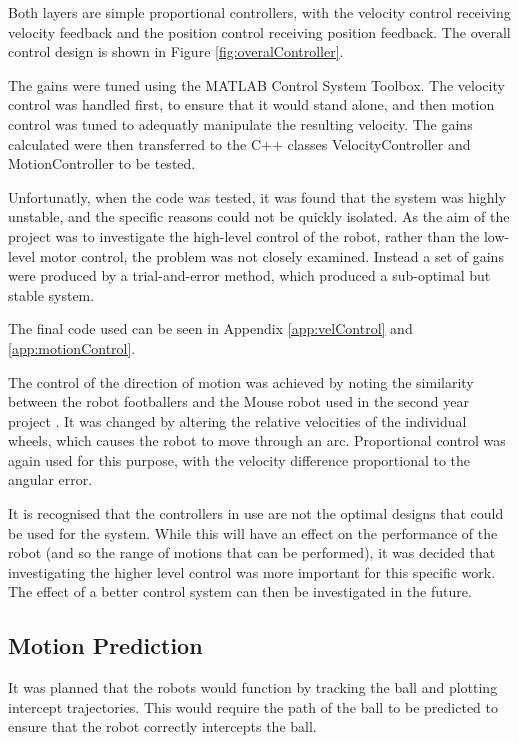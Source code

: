 \documentclass[10pt]{article}
\begin{document}
Both layers are simple proportional controllers, with the velocity control
receiving velocity feedback and the position control receiving position
feedback.  The overall control design is shown in Figure
\ref{fig:overalController}.

The gains were tuned using the MATLAB Control System Toolbox. The velocity
control was handled first, to ensure that it would stand alone, and then motion
control was tuned to adequatly manipulate the resulting velocity.  The gains
calculated were then transferred to the C++ classes VelocityController and
MotionController to be tested.

Unfortunatly, when the code was tested, it was found that the system was highly
unstable, and the specific reasons could not be quickly isolated.  As the aim of
the project was to investigate the high-level control of the robot, rather than
the low-level motor control, the problem was not closely examined.  Instead a
set of gains were produced by a trial-and-error method, which produced a
sub-optimal but stable system.

The final code used can be seen in Appendix \ref{app:velControl} and 
\ref{app:motionControl}.

The control of the direction of motion was achieved by noting the similarity
between the robot footballers and the Mouse robot used in the second year
project \cite{mouseProjectReport}.  It was changed by altering the relative
velocities of the individual wheels, which causes the robot to move through an
arc.  Proportional control was again used for this purpose, with the velocity
difference proportional to the angular error.

It is recognised that the controllers in use are not the optimal designs that
could be used for the system.  While this will have an effect on the performance
of the robot (and so the range of motions that can be performed), it was decided
that investigating the higher level control was more important for this specific
work.  The effect of a better control system can then be investigated in the
future.

\subsection{Motion Prediction}
It was planned that the robots would function by tracking the ball and plotting
intercept trajectories.  This would require the path of the ball to be predicted
to ensure that the robot correctly intercepts the ball.
\end{document}
